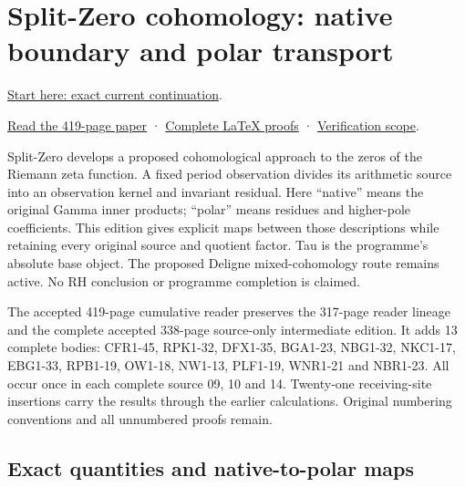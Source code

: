 \documentclass[
]{article}
\begin{document}
\section{Split-Zero cohomology: native boundary and polar
transport}\label{split-zero-cohomology-native-boundary-and-polar-transport-1}

\href{https://github.com/KokunoYumeto/zeta-function-research-reader/blob/main/workbenches/splitzero-tandem/continuations/20260915-native-boundary-continuation/00_CONTINUE_HERE.md}{Start
here: exact current continuation}.

\href{https://github.com/KokunoYumeto/zeta-function-research-reader/blob/main/workbenches/splitzero-tandem/continuations/20260915-native-boundary-continuation/15_CURRENT_MIXED_CONTROL_READER.pdf}{Read
the 419-page paper} ·
\href{https://github.com/KokunoYumeto/zeta-function-research-reader/blob/main/workbenches/splitzero-tandem/continuations/20260915-native-boundary-continuation/14_CURRENT_KERNEL_AND_MULTIPLICITY_PROOFS.tex}{Complete
LaTeX proofs} ·
\href{https://github.com/KokunoYumeto/zeta-function-research-reader/blob/main/workbenches/splitzero-tandem/continuations/20260915-native-boundary-continuation/12_VALIDATION.md}{Verification
scope}.

Split-Zero develops a proposed cohomological approach to the zeros of
the Riemann zeta function. A fixed period observation divides its
arithmetic source into an observation kernel and invariant residual.
Here ``native'' means the original Gamma inner products; ``polar'' means
residues and higher-pole coefficients. This edition gives explicit maps
between those descriptions while retaining every original source and
quotient factor. Tau is the programme's absolute base object. The
proposed Deligne mixed-cohomology route remains active. No RH conclusion
or programme completion is claimed.

The accepted 419-page cumulative reader preserves the 317-page reader
lineage and the complete accepted 338-page source-only intermediate
edition. It adds 13 complete bodies: CFR1-45, RPK1-32, DFX1-35, BGA1-23,
NBG1-32, NKC1-17, EBG1-33, RPB1-19, OW1-18, NW1-13, PLF1-19, WNR1-21 and
NBR1-23. All occur once in each complete source 09, 10 and 14.
Twenty-one receiving-site insertions carry the results through the
earlier calculations. Original numbering conventions and all unnumbered
proofs remain.

\subsection{Exact quantities and native-to-polar
maps}\label{exact-quantities-and-native-to-polar-maps}
\end{document}
